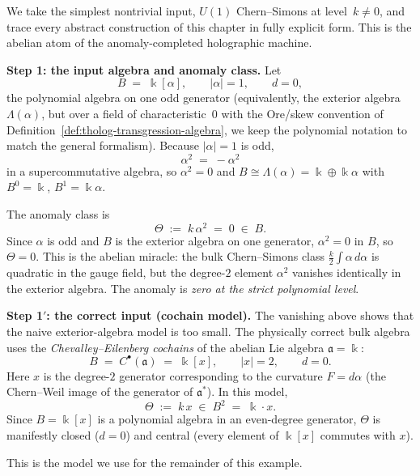 \begin{example}
We take the simplest nontrivial input, $U(1)$ Chern--Simons at
level~$k\neq 0$, and trace every abstract construction of this chapter
in fully explicit form. This is the abelian atom of the anomaly-completed
holographic machine.

\medskip
\noindent\textbf{Step 1: the input algebra and anomaly class.}
Let
\[
B \;=\; \Bbbk[\alpha],
\qquad |\alpha|=1,\qquad d=0,
\]
the polynomial algebra on one odd generator (equivalently, the
exterior algebra $\Lambda(\alpha)$, but over a field of
characteristic~$0$ with the Ore/skew convention of
Definition~\ref{def:tholog-transgression-algebra}, we keep
the polynomial notation to match the general formalism).
Because $|\alpha|=1$ is odd,
\[
\alpha^2 \;=\; -\alpha^2
\]
in a supercommutative algebra, so $\alpha^2=0$ and $B\cong\Lambda(\alpha)
= \Bbbk\oplus\Bbbk\alpha$ with $B^0=\Bbbk$, $B^1=\Bbbk\alpha$.

The anomaly class is
\[
\Theta \;:=\; k\,\alpha^2 \;=\; 0 \;\in\; B.
\]
Since $\alpha$ is odd and $B$ is the exterior algebra on one generator,
$\alpha^2=0$ in $B$, so $\Theta=0$.
This is the abelian miracle: the bulk Chern--Simons class
$\frac{k}{2}\int\alpha\,d\alpha$ is quadratic in the gauge field, but
the degree-$2$ element $\alpha^2$ vanishes identically in the exterior
algebra. The anomaly is \emph{zero at the strict polynomial level}.

\medskip
\noindent\textbf{Step 1$'$: the correct input (cochain model).}
The vanishing above shows that the naive exterior-algebra model is too
small. The physically correct bulk algebra uses the \emph{Chevalley--Eilenberg
cochains} of the abelian Lie algebra $\mathfrak{a}=\Bbbk$:
\[
B \;=\; C^\bullet(\mathfrak{a}) \;=\; \Bbbk[x],
\qquad |x|=2,\qquad d=0.
\]
Here $x$ is the degree-$2$ generator corresponding to the curvature
$F=d\alpha$ (the Chern--Weil image of the generator of $\mathfrak{a}^*$).
In this model,
\[
\Theta \;:=\; k\,x \;\in\; B^2 \;=\; \Bbbk\cdot x.
\]
Since $B=\Bbbk[x]$ is a polynomial algebra in an even-degree generator,
$\Theta$ is manifestly closed ($d=0$) and central (every element of
$\Bbbk[x]$ commutes with $x$).

This is the model we use for the remainder of this example.


\end{example}
